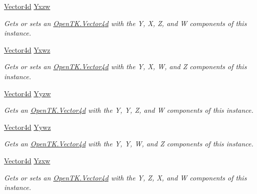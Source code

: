 \begin{DoxyCompactItemize}
\hyperlink{struct_open_t_k_1_1_vector4d}{Vector4d} \hyperlink{struct_open_t_k_1_1_vector4d_af78b309cbef96003bc9c7b85f067376e}{Yxzw}
\begin{DoxyCompactList}\small\item\em Gets or sets an \hyperlink{struct_open_t_k_1_1_vector4d}{Open\-T\-K.\-Vector4d} with the Y, X, Z, and W components of this instance. \end{DoxyCompactList}\item 
\hyperlink{struct_open_t_k_1_1_vector4d}{Vector4d} \hyperlink{struct_open_t_k_1_1_vector4d_aa2e3d3a897d3751676cd2de1a21099f5}{Yxwz}
\begin{DoxyCompactList}\small\item\em Gets or sets an \hyperlink{struct_open_t_k_1_1_vector4d}{Open\-T\-K.\-Vector4d} with the Y, X, W, and Z components of this instance. \end{DoxyCompactList}\item 
\hyperlink{struct_open_t_k_1_1_vector4d}{Vector4d} \hyperlink{struct_open_t_k_1_1_vector4d_a577be77e6fc22221f6b7244ffd00db6a}{Yyzw}
\begin{DoxyCompactList}\small\item\em Gets an \hyperlink{struct_open_t_k_1_1_vector4d}{Open\-T\-K.\-Vector4d} with the Y, Y, Z, and W components of this instance. \end{DoxyCompactList}\item 
\hyperlink{struct_open_t_k_1_1_vector4d}{Vector4d} \hyperlink{struct_open_t_k_1_1_vector4d_ab67a4a13e1eb79b5093ff6ff2db513f6}{Yywz}
\begin{DoxyCompactList}\small\item\em Gets an \hyperlink{struct_open_t_k_1_1_vector4d}{Open\-T\-K.\-Vector4d} with the Y, Y, W, and Z components of this instance. \end{DoxyCompactList}\item 
\hyperlink{struct_open_t_k_1_1_vector4d}{Vector4d} \hyperlink{struct_open_t_k_1_1_vector4d_a8f2c1ac7c4cb21f032c1768d7221b9bf}{Yzxw}
\begin{DoxyCompactList}\small\item\em Gets or sets an \hyperlink{struct_open_t_k_1_1_vector4d}{Open\-T\-K.\-Vector4d} with the Y, Z, X, and W components of this instance. \end{DoxyCompactList}\item 

\end{DoxyCompactItemize}
